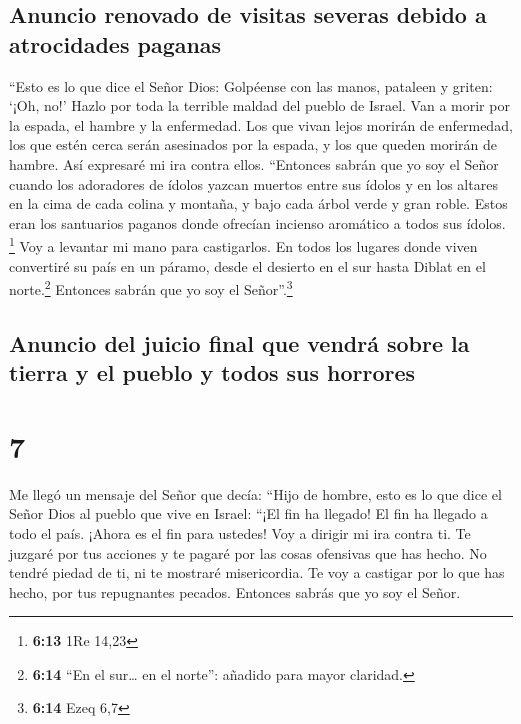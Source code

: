 \hypertarget{anuncio-renovado-de-visitas-severas-debido-a-atrocidades-paganas}{%
\subsection{Anuncio renovado de visitas severas debido a atrocidades
paganas}\label{anuncio-renovado-de-visitas-severas-debido-a-atrocidades-paganas}}

 ``Esto es lo que dice el Señor Dios: Golpéense con las
manos, pataleen y griten: `¡Oh, no!' Hazlo por toda la terrible maldad
del pueblo de Israel. Van a morir por la espada, el hambre y la
enfermedad.  Los que vivan lejos morirán de enfermedad,
los que estén cerca serán asesinados por la espada, y los que queden
morirán de hambre. Así expresaré mi ira contra ellos. 
``Entonces sabrán que yo soy el Señor cuando los adoradores de ídolos
yazcan muertos entre sus ídolos y en los altares en la cima de cada
colina y montaña, y bajo cada árbol verde y gran roble. Estos eran los
santuarios paganos donde ofrecían incienso aromático a todos sus ídolos.
\footnote{\textbf{6:13} 1Re 14,23}  Voy a levantar mi
mano para castigarlos. En todos los lugares donde viven convertiré su
país en un páramo, desde el desierto en el sur hasta Diblat en el
norte.\footnote{\textbf{6:14} ``En el sur\ldots{} en el norte'': añadido
  para mayor claridad.} Entonces sabrán que yo soy el
Señor''.\footnote{\textbf{6:14} Ezeq 6,7}

\hypertarget{anuncio-del-juicio-final-que-vendruxe1-sobre-la-tierra-y-el-pueblo-y-todos-sus-horrores}{%
\subsection{Anuncio del juicio final que vendrá sobre la tierra y el
pueblo y todos sus
horrores}\label{anuncio-del-juicio-final-que-vendruxe1-sobre-la-tierra-y-el-pueblo-y-todos-sus-horrores}}

\hypertarget{section-6}{%
\section{7}\label{section-6}}

 Me llegó un mensaje del Señor que decía: 
``Hijo de hombre, esto es lo que dice el Señor Dios al pueblo que vive
en Israel: ``¡El fin ha llegado! El fin ha llegado a todo el país.
 ¡Ahora es el fin para ustedes! Voy a dirigir mi ira
contra ti. Te juzgaré por tus acciones y te pagaré por las cosas
ofensivas que has hecho.  No tendré piedad de ti, ni te
mostraré misericordia. Te voy a castigar por lo que has hecho, por tus
repugnantes pecados. Entonces sabrás que yo soy el Señor.

